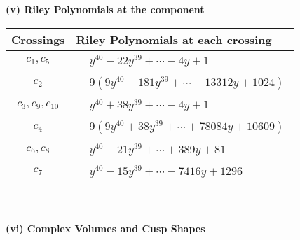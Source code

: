 \documentclass[1p]{elsarticle_modified}
\theoremstyle{definition}
\begin{document}
\newpage\renewcommand{\arraystretch}{1}
\flushleft \textbf{(v) Riley Polynomials at the component}\newline \\
\begin{tabular}{m{50pt}|m{274pt}}
Crossings & \hspace{64pt}Riley Polynomials at each crossing \\
\hline $$\begin{aligned}c_{1},c_{5}\end{aligned}$$&$\begin{aligned}
&y^{40}-22 y^{39}+\cdots-4 y+1
\end{aligned}$\\
\hline $$\begin{aligned}c_{2}\end{aligned}$$&$\begin{aligned}
&9(9 y^{40}-181 y^{39}+\cdots-13312 y+1024)
\end{aligned}$\\
\hline $$\begin{aligned}c_{3},c_{9},c_{10}\end{aligned}$$&$\begin{aligned}
&y^{40}+38 y^{39}+\cdots-4 y+1
\end{aligned}$\\
\hline $$\begin{aligned}c_{4}\end{aligned}$$&$\begin{aligned}
&9(9 y^{40}+38 y^{39}+\cdots+78084 y+10609)
\end{aligned}$\\
\hline $$\begin{aligned}c_{6},c_{8}\end{aligned}$$&$\begin{aligned}
&y^{40}-21 y^{39}+\cdots+389 y+81
\end{aligned}$\\
\hline $$\begin{aligned}c_{7}\end{aligned}$$&$\begin{aligned}
&y^{40}-15 y^{39}+\cdots-7416 y+1296
\end{aligned}$\\
\hline
\end{tabular}\\~\\
\newpage\flushleft \textbf{(vi) Complex Volumes and Cusp Shapes}
\end{document}
